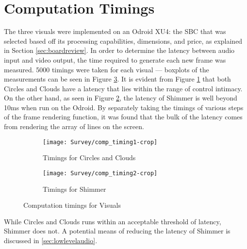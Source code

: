 \documentclass[../initial_thesis.tex]{subfiles}
\begin{document}
\section{Computation Timings} \label{sec:timings}
The three visuals were implemented on an Odroid XU4: the SBC that was selected based off its processing capabilities, dimensions, and price, as explained in Section \ref{sec:boardreview}. In order to determine the latency between audio input and video output, the time required to generate each new frame was measured. 5000 timings were taken for each visual --- boxplots of the measurements can be seen in Figure \ref{fig:comp_timings}. It is evident from Figure \ref{fig:timings_circlesclouds} that both Circles and Clouds have a latency that lies within the range of control intimacy. On the other hand, as seen in Figure \ref{fig:timings_shimmer}, the latency of Shimmer is well beyond 10ms when run on the Odroid. By separately taking the timings of various steps of the frame rendering function, it was found that the bulk of the latency comes from rendering the array of lines on the screen.

\begin{figure}
  \begin{subfigure}{0.5\textwidth}
    \centering
    \texttt{[image: Survey/comp\_timing1-crop]}
    \caption{Timings for Circles and Clouds}
    \label{fig:timings_circlesclouds}
  \end{subfigure}
  \begin{subfigure}{0.5\textwidth}
    \centering
    \texttt{[image: Survey/comp\_timing2-crop]}
    \caption{Timings for Shimmer}
    \label{fig:timings_shimmer}
  \end{subfigure}
  \caption{Computation timings for Visuals}
  \label{fig:comp_timings}
\end{figure}

While Circles and Clouds runs within an acceptable threshold of latency, Shimmer does not. A potential means of reducing the latency of Shimmer is discussed in \ref{sec:lowlevelaudio}. 
\end{document}
